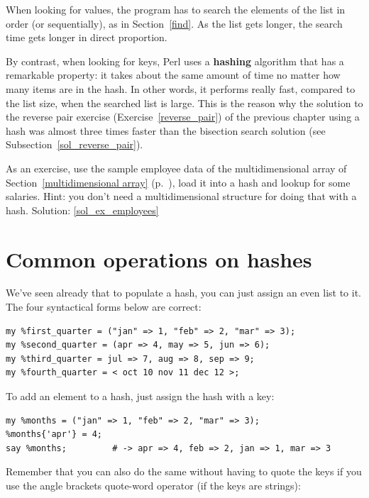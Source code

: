When looking for values, the program has to search the 
elements of the list in order (or sequentially), as in 
Section~\ref{find}.  As the list gets longer, the search 
time gets longer in direct proportion.

By contrast, when looking for keys, Perl uses a {\bf hashing} 
algorithm that has a remarkable property: it takes about 
the same amount of time no matter how many items are in 
the hash. In other words, it performs really fast, compared 
to the list size, when the 
searched list is large. This is the reason why the solution to 
the reverse pair exercise (Exercise~\ref{reverse_pair}) of the 
previous chapter using a hash was almost three times 
faster than the bisection search solution 
(see Subsection~\ref{sol_reverse_pair}).

\label{ex_employees}
As an exercise, use the sample employee data of the 
multidimensional array of Section~\ref{multidimensional array} 
(p.~\pageref{multidimensional array}), load it into a hash and 
lookup for some salaries. Hint: you don't need a 
multidimensional structure for doing that with a hash.
Solution: \ref{sol_ex_employees}


\section{Common operations on hashes}

We've seen already that to populate a hash, you can just 
assign an even list to it. The four syntactical forms 
below are correct:

\begin{verbatim}
my %first_quarter = ("jan" => 1, "feb" => 2, "mar" => 3);
my %second_quarter = (apr => 4, may => 5, jun => 6);
my %third_quarter = jul => 7, aug => 8, sep => 9;
my %fourth_quarter = < oct 10 nov 11 dec 12 >;
\end{verbatim}

To add an element to a hash, just assign the hash with a key:

\begin{verbatim}
my %months = ("jan" => 1, "feb" => 2, "mar" => 3);
%months{'apr'} = 4;
say %months;         # -> apr => 4, feb => 2, jan => 1, mar => 3
\end{verbatim}

Remember that you can also do the same without having to 
quote the keys if you use the angle brackets quote-word 
operator (if the keys are strings):

